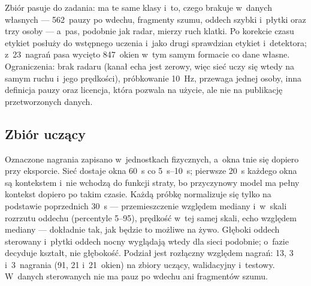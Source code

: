 \documentclass[12pt,a4paper,oneside]{report}
\begin{document}
Zbiór pasuje do zadania: ma te same klasy i~to, czego brakuje w~danych
własnych --- 562~pauzy po wdechu, fragmenty szumu, oddech szybki i~płytki oraz
trzy osoby --- a~pas, podobnie jak radar, mierzy ruch klatki. Po korekcie
czasu etykiet posłuży do wstępnego uczenia i~jako drugi sprawdzian etykiet
i~detektora; z~23~nagrań pasa wycięto 847~okien w~tym samym formacie co dane
własne. Ograniczenia: brak radaru (kanał echa jest zerowy, więc sieć uczy się
wtedy na samym ruchu i~jego prędkości), próbkowanie \SI{10}{Hz}, przewaga
jednej osoby, inna definicja pauzy oraz licencja, która pozwala na użycie,
ale nie na publikację przetworzonych danych.

\subsection{Zbiór uczący}
\label{sec:sieci-zbior-uczacy}
Oznaczone nagrania zapisano w~jednostkach fizycznych, a~okna tnie się
dopiero przy eksporcie. Sieć dostaje okna \SI{60}{s} co \SIrange{5}{10}{s}; pierwsze
\SI{20}{s} każdego okna są kontekstem i~nie wchodzą do funkcji straty, bo
przyczynowy model ma pełny kontekst dopiero po takim czasie. Każdą próbkę
normalizuje się tylko na podstawie poprzednich \SI{30}{s} --- przemieszczenie
względem mediany i~w~skali rozrzutu oddechu (percentyle 5--95), prędkość
w~tej samej skali, echo względem mediany --- dokładnie tak, jak będzie to
możliwe na żywo. Głęboki oddech sterowany i~płytki oddech nocny wyglądają
wtedy dla sieci podobnie; o~fazie decyduje kształt, nie głębokość. Podział
jest rozłączny względem nagrań: 13, 3 i~3~nagrania (91, 21 i~21~okien) na
zbiory uczący, walidacyjny i~testowy. W~danych sterowanych nie ma pauz po
wdechu ani fragmentów szumu.
\end{document}
